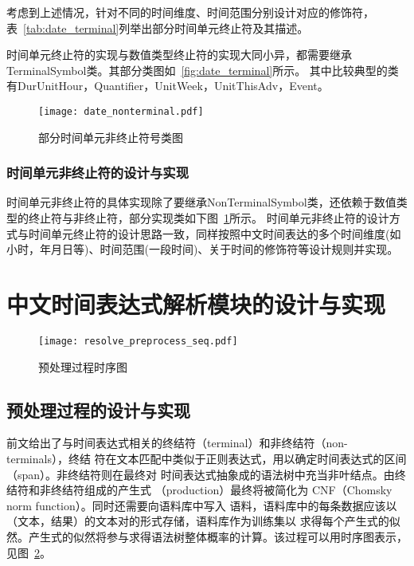 考虑到上述情况，针对不同的时间维度、时间范围分别设计对应的修饰符，表~\ref{tab:date_terminal}列举出部分时间单元终止符及其描述。


时间单元终止符的实现与数值类型终止符的实现大同小异，都需要继承TerminalSymbol类。其部分类图如~\ref{fig:date_terminal}所示。
其中比较典型的类有DurUnitHour，Quantifier，UnitWeek，UnitThisAdv，Event。

\begin{figure}[h]
    \centering
    \texttt{[image: date\_nonterminal.pdf]}
    \caption{部分时间单元非终止符号类图}
    \label{fig:date_nonterminal}
\end{figure}

\subsubsection{时间单元非终止符的设计与实现}

时间单元非终止符的具体实现除了要继承NonTerminalSymbol类，还依赖于数值类型的终止符与非终止符，部分实现类如下图~\ref{fig:date_nonterminal}所示。
时间单元非终止符的设计方式与时间单元终止符的设计思路一致，同样按照中文时间表达的多个时间维度(如小时，年月日等)、时间范围(一段时间)、关于时间的修饰符等设计规则并实现。

\section{中文时间表达式解析模块的设计与实现}

\begin{figure}[h]
    \centering
    \texttt{[image: resolve\_preprocess\_seq.pdf]}
    \caption{预处理过程时序图}
    \label{fig:resolve_preprocess_seq}
\end{figure}

\subsection{预处理过程的设计与实现}

前文给出了与时间表达式相关的终结符（terminal）和非终结符（non-terminals），终结
符在文本匹配中类似于正则表达式，用以确定时间表达式的区间（span）。非终结符则在最终对
时间表达式抽象成的语法树中充当非叶结点。由终结符和非终结符组成的产生式
（production）最终将被简化为 CNF（Chomsky norm function）。同时还需要向语料库中写入
语料，语料库中的每条数据应该以（文本，结果）的文本对的形式存储，语料库作为训练集以
求得每个产生式的似然。产生式的似然将参与求得语法树整体概率的计算。该过程可以用时序图表示，见图~\ref{fig:resolve_preprocess_seq}。



